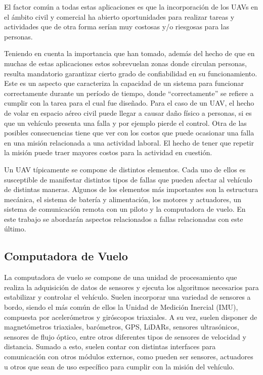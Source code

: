 El factor común a todas estas aplicaciones es que la incorporación de los UAVs en el ámbito civil y comercial ha abierto oportunidades para realizar tareas y actividades que de otra forma serían muy costosas y/o riesgosas para las personas.

Teniendo en cuenta la importancia que han tomado, además del hecho de que en muchas de estas aplicaciones estos sobrevuelan zonas donde circulan personas, resulta mandatorio garantizar cierto grado de confiabilidad en su funcionamiento. Este es un aspecto que caracteriza la capacidad de un sistema para funcionar correctamente durante un período de tiempo, donde ``correctamente'' se refiere a cumplir con la tarea para el cual fue diseñado. Para el caso de un UAV, el hecho de volar en espacio aéreo civil puede llegar a causar daño físico a personas, si es que un vehículo presenta una falla y por ejemplo pierde el control. Otra de las posibles consecuencias tiene que ver con los costos que puede ocasionar una falla en una misión relacionada a una actividad laboral. El hecho de tener que repetir la misión puede traer mayores costos para la actividad en cuestión.

Un UAV típicamente se compone de distintos elementos. Cada uno de ellos es susceptible de manifestar distintos tipos de fallas que pueden afectar al vehículo de distintas maneras. Algunos de los elementos más importantes son la estructura mecánica, el sistema de batería y alimentación, los motores y actuadores, un sistema de comunicación remota con un piloto y la computadora de vuelo. En este trabajo se abordarán aspectos relacionados a fallas relacionadas con este último.

\subsection{Computadora de Vuelo}

La computadora de vuelo se compone de una unidad de procesamiento que realiza la adquisición de datos de sensores y ejecuta los algoritmos necesarios para estabilizar y controlar el vehículo. Suelen incorporar una variedad de sensores a bordo, siendo el más común de ellos la Unidad de Medición Inercial (IMU), compuesta por acelerómetros y giróscopos triaxiales. A su vez, suelen disponer de magnetómetros triaxiales, barómetros, GPS, LiDARs, sensores ultrasónicos, sensores de flujo óptico, entre otros diferentes tipos de sensores de velocidad y distancia. Sumado a esto, suelen contar con distintas interfaces para comunicación con otros módulos externos, como pueden ser sensores, actuadores u otros que sean de uso específico para cumplir con la misión del vehículo.

